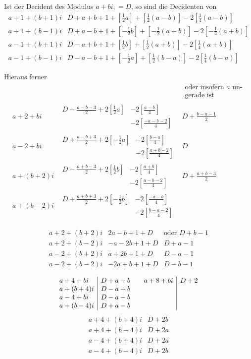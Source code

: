 Ist der Decident des Modulus $a+bi,=D$, so sind die Decidenten von
{\small
\[
\begin{array}{l|l}
a+1+(b+1)i&D+a+b+1+[\tfrac12a]+[\tfrac12(a-b)]-2[\tfrac14(a-b)]\\
a+1+(b-1)i&D+a-b+1+[-\tfrac12b]+[-\tfrac12(a+b)]-2[-\tfrac14(a+b)]\\
a-1+(b+1)i&D-a+b+1+[\tfrac12b]+[\tfrac12(a+b)]-2[\tfrac14(a+b)]\\
a-1+(b-1)i&D-a-b+1+[-\tfrac12a]+[\tfrac12(b-a)]-2[\tfrac14(b-a)]
\end{array}
\]
}

Hieraus ferner
{\footnotesize
\[
\begin{array}{l|l|l}
&&\begin{gathered}\text{oder insofern }a\text{ un-}\\\text{gerade ist}\end{gathered}\\
a+2+bi&\begin{aligned}D-\tfrac{a-b-3}2+2[\tfrac12a]&-2[\tfrac{a-b}4]\\&-2[\tfrac{-a-b-2}4]\end{aligned}&D+\tfrac{b-a-1}2\\[1ex]
a-2+bi&\begin{aligned}D+\tfrac{a-b+3}2+2[-\tfrac12a]&-2[\tfrac{b-a}4]\\&-2[\tfrac{a+b-2}4]\end{aligned}&D\\[1ex]
a+(b+2)i&\begin{aligned}D-\tfrac{a+b-3}2+2[\tfrac12b]&-2[\tfrac{a+b}4]\\&-2[\tfrac{a-b-2}4]\end{aligned}&D+\tfrac{a+b-3}2\\[1ex]
a+(b-2)i&\begin{aligned}D+\tfrac{a+b+3}2+2[-\tfrac12b]&-2[\tfrac{-a-b}4]\\&-2[\tfrac{b-a-2}4]\end{aligned}&
\end{array}
\]
}

\[
\begin{array}{l|rl}
a+2+(b+2)i&2a-b+1+D&\text{oder }D+b-1\\
a+2+(b-2)i&-a-2b+1+D&D+a-1\\
a-2+(b+2)i&a+2b+1+D&D-a-1\\
a-2+(b-2)i&-2a+b+1+D&D-b-1
\end{array}
\]


\[
\begin{array}{l|l@{\qquad}l|l}
a+4+bi&D+a+b&a+8+bi&D+2\\
a+(b+4)i&D-a+b&&\\
a-4+bi&D-a-b&&\\
a+(b-4)i&D+a-b&&
\end{array}
\]
\[
\begin{array}{l|l}
a+4+(b+4)i&D+2b\\
a+4+(b-4)i&D+2a\\
a-4+(b+4)i&D+2a\\
a-4+(b-4)i&D+2b
\end{array}
\]

